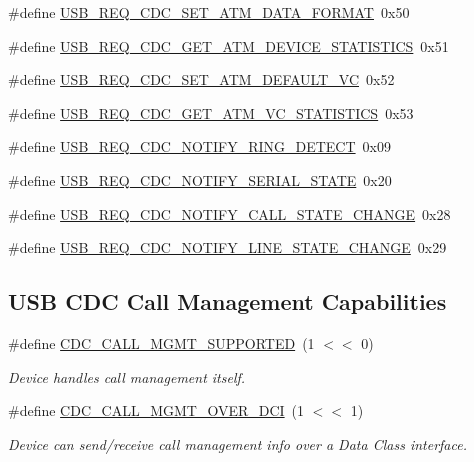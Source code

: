 \begin{DoxyCompactItemize}
\#define \hyperlink{group__cdc__protocol__group_ga95ef1719d5a884fec7ee4c2d7db80d82}{\-U\-S\-B\-\_\-\-R\-E\-Q\-\_\-\-C\-D\-C\-\_\-\-S\-E\-T\-\_\-\-A\-T\-M\-\_\-\-D\-A\-T\-A\-\_\-\-F\-O\-R\-M\-A\-T}~0x50
\item 
\#define \hyperlink{group__cdc__protocol__group_ga51a6c3496ca4f926d0401126e3e9aee6}{\-U\-S\-B\-\_\-\-R\-E\-Q\-\_\-\-C\-D\-C\-\_\-\-G\-E\-T\-\_\-\-A\-T\-M\-\_\-\-D\-E\-V\-I\-C\-E\-\_\-\-S\-T\-A\-T\-I\-S\-T\-I\-C\-S}~0x51
\item 
\#define \hyperlink{group__cdc__protocol__group_gabb6d36ab906dfa74e80b42e7d87660ee}{\-U\-S\-B\-\_\-\-R\-E\-Q\-\_\-\-C\-D\-C\-\_\-\-S\-E\-T\-\_\-\-A\-T\-M\-\_\-\-D\-E\-F\-A\-U\-L\-T\-\_\-\-V\-C}~0x52
\item 
\#define \hyperlink{group__cdc__protocol__group_ga84ff24c8cbc01c595db2ba129640befb}{\-U\-S\-B\-\_\-\-R\-E\-Q\-\_\-\-C\-D\-C\-\_\-\-G\-E\-T\-\_\-\-A\-T\-M\-\_\-\-V\-C\-\_\-\-S\-T\-A\-T\-I\-S\-T\-I\-C\-S}~0x53
\item 
\#define \hyperlink{group__cdc__protocol__group_gab920e7b71fb8698431c35cef60126777}{\-U\-S\-B\-\_\-\-R\-E\-Q\-\_\-\-C\-D\-C\-\_\-\-N\-O\-T\-I\-F\-Y\-\_\-\-R\-I\-N\-G\-\_\-\-D\-E\-T\-E\-C\-T}~0x09
\item 
\#define \hyperlink{group__cdc__protocol__group_ga55b0f0c908d50cb9aa8553a17f118e12}{\-U\-S\-B\-\_\-\-R\-E\-Q\-\_\-\-C\-D\-C\-\_\-\-N\-O\-T\-I\-F\-Y\-\_\-\-S\-E\-R\-I\-A\-L\-\_\-\-S\-T\-A\-T\-E}~0x20
\item 
\#define \hyperlink{group__cdc__protocol__group_gafa88febd1fa012a2546955f369dda31a}{\-U\-S\-B\-\_\-\-R\-E\-Q\-\_\-\-C\-D\-C\-\_\-\-N\-O\-T\-I\-F\-Y\-\_\-\-C\-A\-L\-L\-\_\-\-S\-T\-A\-T\-E\-\_\-\-C\-H\-A\-N\-G\-E}~0x28
\item 
\#define \hyperlink{group__cdc__protocol__group_ga56a8138659ffd7322ba8be458deacb85}{\-U\-S\-B\-\_\-\-R\-E\-Q\-\_\-\-C\-D\-C\-\_\-\-N\-O\-T\-I\-F\-Y\-\_\-\-L\-I\-N\-E\-\_\-\-S\-T\-A\-T\-E\-\_\-\-C\-H\-A\-N\-G\-E}~0x29
\end{DoxyCompactItemize}
\subsection*{\-U\-S\-B \-C\-D\-C \-Call \-Management \-Capabilities}
\begin{DoxyCompactItemize}
\item 
\#define \hyperlink{group__cdc__protocol__group_gadba5c50400705310683bce4604525634}{\-C\-D\-C\-\_\-\-C\-A\-L\-L\-\_\-\-M\-G\-M\-T\-\_\-\-S\-U\-P\-P\-O\-R\-T\-E\-D}~(1 $<$$<$ 0)
\begin{DoxyCompactList}\small\item\em \-Device handles call management itself. \end{DoxyCompactList}\item 
\#define \hyperlink{group__cdc__protocol__group_ga84beb2dffd6b294aed339d1dcf4dadf2}{\-C\-D\-C\-\_\-\-C\-A\-L\-L\-\_\-\-M\-G\-M\-T\-\_\-\-O\-V\-E\-R\-\_\-\-D\-C\-I}~(1 $<$$<$ 1)
\begin{DoxyCompactList}\small\item\em \-Device can send/receive call management info over a \-Data \-Class interface. \end{DoxyCompactList}\end{DoxyCompactItemize}
